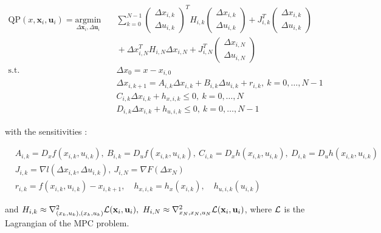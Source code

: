 \documentclass[12pt]{article}
\begin{document}
\begin{align*}
	\mathrm{QP}(x, \mathbf{x}_i, \mathbf{u}_i)=\underset{\Delta\mathbf{x}_i,\Delta\mathbf{u}_i}{\mathrm{argmin}} & \quad \sum_{k=0}^{N-1}\begin{pmatrix}\Delta x_{i,k}\\\Delta u_{i,k}\end{pmatrix}^TH_{i,k}\begin{pmatrix}\Delta x_{i,k}\\\Delta u_{i,k}\end{pmatrix}+J_{i,k}^T\begin{pmatrix}\Delta x_{i,k}\\\Delta u_{i,k}\end{pmatrix}\\
	&\quad +\Delta x_{i,N}^TH_{i,N}\Delta x_{i,N}+J_{i,N}^T\begin{pmatrix}\Delta x_{i,N}\\\Delta u_{i,N}\end{pmatrix}\\
	\text{s.t.} &\quad \Delta x_0=x-x_{i,0}\\
	&\quad \Delta x_{i,k+1}=A_{i,k}\Delta x_{i,k}+B_{i,k}\Delta u_{i,k}+r_{i,k},~k=0,\dots,N-1\\
	&\quad C_{i,k}\Delta x_{i,k}+h_{x,i,k}\leq 0,~k=0,\dots,N\\
	&\quad D_{i,k}\Delta x_{i,k}+h_{u,i,k}\leq 0,~k=0,\dots,N-1
\end{align*}

\noindent with the sensitivities :

\begin{align*}
		&A_{i,k}=D_xf(x_{i,k}, u_{i,k}),~B_{i,k}=D_uf(x_{i,k}, u_{i,k}),~C_{i,k}=D_xh(x_{i,k}, u_{i,k}),~D_{i,k}=D_uh(x_{i,k}, u_{i,k})\\
		&J_{i,k}=\nabla l(\Delta x_{i,k},\Delta u_{i,k}),~J_{i,N}=\nabla F(\Delta x_N)\\
		&r_{i,k}=f(x_{i,k}, u_{i,k})-x_{i,k+1},\quad h_{x,i,k}=h_x(x_{i,k}),\quad h_{u,i,k}(u_{i,k})
\end{align*}

\noindent and $H_{i,k}\approx \nabla^2_{(x_k,u_k),(x_k,u_k)}\mathcal{L}(\mathbf{x}_i,\mathbf{u}_i),~H_{i,N}\approx\nabla^2_{x_N,x_N,u_N}\mathcal{L}(\mathbf{x}_i,\mathbf{u}_i)$, where $\mathcal{L}$ is the Lagrangian of the MPC problem.
\end{document}
